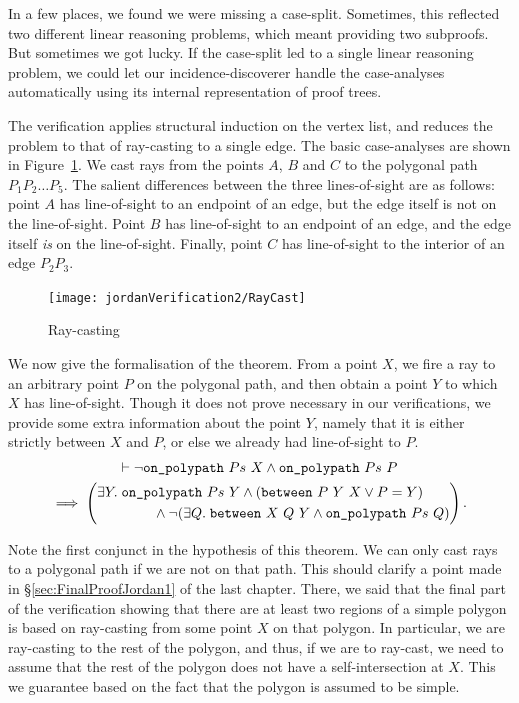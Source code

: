 In a few places, we found we were missing a case-split. Sometimes, this reflected two different linear reasoning problems, which meant providing two subproofs. But sometimes we got lucky. If the case-split led to a single linear reasoning problem, we could let our incidence-discoverer handle the case-analyses automatically using its internal representation of proof trees.

The verification applies structural induction on the vertex list, and reduces the problem to that of ray-casting to a single edge. The basic case-analyses are shown in Figure~\ref{fig:RayCast}. We cast rays from the points $A$, $B$ and $C$ to the polygonal path $P_1P_2\ldots P_5$. The salient differences between the three lines-of-sight are as follows: point $A$ has line-of-sight to an endpoint of an edge, but the edge itself is not on the line-of-sight. Point $B$ has line-of-sight to an endpoint of an edge, and the edge itself \emph{is} on the line-of-sight. Finally, point $C$ has line-of-sight to the interior of an edge $P_2P_3$. 

\begin{figure}
\centering\texttt{[image: jordanVerification2/RayCast]}
\caption{Ray-casting}
\label{fig:RayCast}
\end{figure}

We now give the formalisation of the theorem. From a point $X$, we fire a ray to an arbitrary point $P$ on the polygonal path, and then obtain a point $Y$ to which $X$ has line-of-sight. Though it does not prove necessary in our verifications, we provide some extra information about the point $Y$, namely that it is either strictly between $X$ and $P$, or else we already had line-of-sight to $P$. 
\begin{multline}\label{eq:RayCast}
  \vdash\neg\texttt{on\_polypath}\ Ps\ X \wedge \texttt{on\_polypath}\ Ps\ P\\
  \implies \left(
    \begin{aligned}&\exists Y.\; \texttt{on\_polypath}\ Ps\ Y \wedge (\texttt{between}\ P\ Y\ X \vee P = Y)\\
      &\qquad\qquad\wedge \neg(\exists Q.\; \texttt{between}\ X\ Q\ Y \wedge \texttt{on\_polypath}\ Ps\ Q)
    \end{aligned}\right).
\end{multline}

Note the first conjunct in the hypothesis of this theorem. We can only cast rays to a polygonal path if we are not on that path. This should clarify a point made in \S\ref{sec:FinalProofJordan1} of the last chapter. There, we said that the final part of the verification showing that there are at least two regions of a simple polygon is based on ray-casting from some point $X$ on that polygon. In particular, we are ray-casting to the rest of the polygon, and thus, if we are to ray-cast, we need to assume that the rest of the polygon does not have a self-intersection at $X$. This we guarantee based on the fact that the polygon is assumed to be simple.

